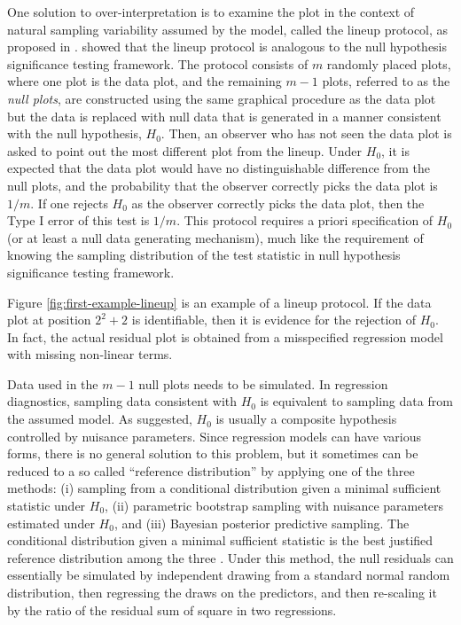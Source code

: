 \documentclass[]{interact}
\theoremstyle{plain}%
\theoremstyle{definition}
\theoremstyle{remark}
\begin{document}
One solution to over-interpretation is to examine the plot in the
context of natural sampling variability assumed by the model, called the
lineup protocol, as proposed in \citet{buja2009statistical}.
\citet{majumder2013validation} showed that the lineup protocol is
analogous to the null hypothesis significance testing framework. The
protocol consists of \(m\) randomly placed plots, where one plot is the
data plot, and the remaining \(m - 1\) plots, referred to as the
\emph{null plots}, are constructed using the same graphical procedure as
the data plot but the data is replaced with null data that is generated
in a manner consistent with the null hypothesis, \(H_0\). Then, an
observer who has not seen the data plot is asked to point out the most
different plot from the lineup. Under \(H_0\), it is expected that the
data plot would have no distinguishable difference from the null plots,
and the probability that the observer correctly picks the data plot is
\(1/m\). If one rejects \(H_0\) as the observer correctly picks the data
plot, then the Type I error of this test is \(1/m\). This protocol
requires a priori specification of \(H_0\) (or at least a null data
generating mechanism), much like the requirement of knowing the sampling
distribution of the test statistic in null hypothesis significance
testing framework.

Figure \ref{fig:first-example-lineup} is an example of a lineup
protocol. If the data plot at position \(2^2 + 2\) is identifiable, then
it is evidence for the rejection of \(H_0\). In fact, the actual
residual plot is obtained from a misspecified regression model with
missing non-linear terms.

Data used in the \(m - 1\) null plots needs to be simulated. In
regression diagnostics, sampling data consistent with \(H_0\) is
equivalent to sampling data from the assumed model. As
\citet{buja2009statistical} suggested, \(H_0\) is usually a composite
hypothesis controlled by nuisance parameters. Since regression models
can have various forms, there is no general solution to this problem,
but it sometimes can be reduced to a so called ``reference
distribution'' by applying one of the three methods: (i) sampling from a
conditional distribution given a minimal sufficient statistic under
\(H_0\), (ii) parametric bootstrap sampling with nuisance parameters
estimated under \(H_0\), and (iii) Bayesian posterior predictive
sampling. The conditional distribution given a minimal sufficient
statistic is the best justified reference distribution among the three
\citep{buja2009statistical}. Under this method, the null residuals can
essentially be simulated by independent drawing from a standard normal
random distribution, then regressing the draws on the predictors, and
then re-scaling it by the ratio of the residual sum of square in two
regressions.
\end{document}
